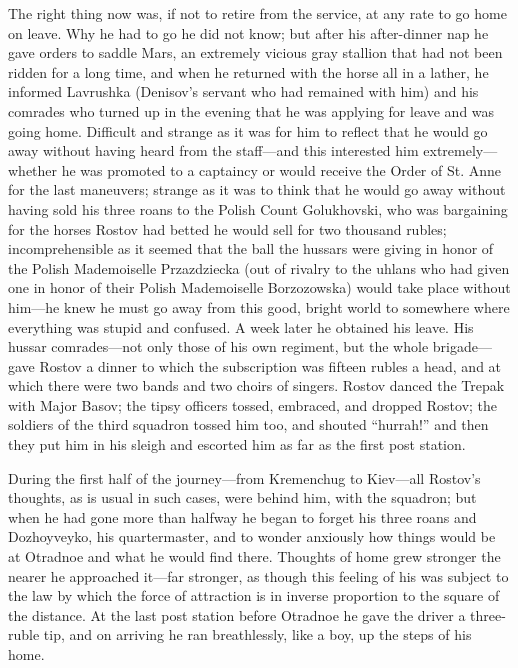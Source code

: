 The right thing now was, if not to retire from the service, at
any rate to go home on leave. Why he had to go he did not know;
but after his after-dinner nap he gave orders to saddle Mars, an
extremely vicious gray stallion that had not been ridden for a
long time, and when he returned with the horse all in a lather,
he informed Lavrushka (Denisov's servant who had remained with
him) and his comrades who turned up in the evening that he was
applying for leave and was going home. Difficult and strange as
it was for him to reflect that he would go away without having
heard from the staff---and this interested him
extremely---whether he was promoted to a captaincy or would
receive the Order of St. Anne for the last maneuvers; strange as
it was to think that he would go away without having sold his
three roans to the Polish Count Golukhovski, who was bargaining
for the horses Rostov had betted he would sell for two thousand
rubles; incomprehensible as it seemed that the ball the hussars
were giving in honor of the Polish Mademoiselle Przazdziecka (out
of rivalry to the uhlans who had given one in honor of their
Polish Mademoiselle Borzozowska) would take place without
him---he knew he must go away from this good, bright world to
somewhere where everything was stupid and confused. A week later
he obtained his leave. His hussar comrades---not only those of
his own regiment, but the whole brigade---gave Rostov a dinner to
which the subscription was fifteen rubles a head, and at which
there were two bands and two choirs of singers. Rostov danced the
Trepak with Major Basov; the tipsy officers tossed, embraced, and
dropped Rostov; the soldiers of the third squadron tossed him
too, and shouted ``hurrah!'' and then they put him in his sleigh
and escorted him as far as the first post station.

During the first half of the journey---from Kremenchug to
Kiev---all Rostov's thoughts, as is usual in such cases, were
behind him, with the squadron; but when he had gone more than
halfway he began to forget his three roans and Dozhoyveyko, his
quartermaster, and to wonder anxiously how things would be at
Otradnoe and what he would find there. Thoughts of home grew
stronger the nearer he approached it---far stronger, as though
this feeling of his was subject to the law by which the force of
attraction is in inverse proportion to the square of the
distance. At the last post station before Otradnoe he gave the
driver a three-ruble tip, and on arriving he ran breathlessly,
like a boy, up the steps of his home.

